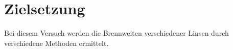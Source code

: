 \section{Zielsetzung}
\label{sec:Zielsetzung}
Bei diesem Versuch werden die Brennweiten verschiedener Linsen durch verschiedene Methoden ermittelt. 
